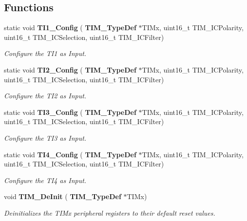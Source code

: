 \subsection*{Functions}
\begin{DoxyCompactItemize}
\item 
static void \textbf{ T\+I1\+\_\+\+Config} (\textbf{ T\+I\+M\+\_\+\+Type\+Def} $\ast$T\+I\+Mx, uint16\+\_\+t T\+I\+M\+\_\+\+I\+C\+Polarity, uint16\+\_\+t T\+I\+M\+\_\+\+I\+C\+Selection, uint16\+\_\+t T\+I\+M\+\_\+\+I\+C\+Filter)
\begin{DoxyCompactList}\small\item\em Configure the T\+I1 as Input. \end{DoxyCompactList}\item 
static void \textbf{ T\+I2\+\_\+\+Config} (\textbf{ T\+I\+M\+\_\+\+Type\+Def} $\ast$T\+I\+Mx, uint16\+\_\+t T\+I\+M\+\_\+\+I\+C\+Polarity, uint16\+\_\+t T\+I\+M\+\_\+\+I\+C\+Selection, uint16\+\_\+t T\+I\+M\+\_\+\+I\+C\+Filter)
\begin{DoxyCompactList}\small\item\em Configure the T\+I2 as Input. \end{DoxyCompactList}\item 
static void \textbf{ T\+I3\+\_\+\+Config} (\textbf{ T\+I\+M\+\_\+\+Type\+Def} $\ast$T\+I\+Mx, uint16\+\_\+t T\+I\+M\+\_\+\+I\+C\+Polarity, uint16\+\_\+t T\+I\+M\+\_\+\+I\+C\+Selection, uint16\+\_\+t T\+I\+M\+\_\+\+I\+C\+Filter)
\begin{DoxyCompactList}\small\item\em Configure the T\+I3 as Input. \end{DoxyCompactList}\item 
static void \textbf{ T\+I4\+\_\+\+Config} (\textbf{ T\+I\+M\+\_\+\+Type\+Def} $\ast$T\+I\+Mx, uint16\+\_\+t T\+I\+M\+\_\+\+I\+C\+Polarity, uint16\+\_\+t T\+I\+M\+\_\+\+I\+C\+Selection, uint16\+\_\+t T\+I\+M\+\_\+\+I\+C\+Filter)
\begin{DoxyCompactList}\small\item\em Configure the T\+I4 as Input. \end{DoxyCompactList}\item 
void \textbf{ T\+I\+M\+\_\+\+De\+Init} (\textbf{ T\+I\+M\+\_\+\+Type\+Def} $\ast$T\+I\+Mx)
\begin{DoxyCompactList}\small\item\em Deinitializes the T\+I\+Mx peripheral registers to their default reset values. \end{DoxyCompactList}\item 

\end{DoxyCompactItemize}
